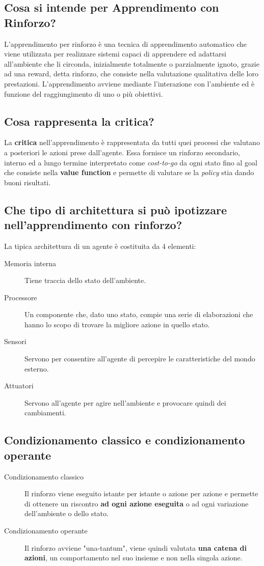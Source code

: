 \documentclass[\main/main.tex]{subfiles}
\begin{document}
\subsection{Cosa si intende per Apprendimento con Rinforzo?}
L'apprendimento per rinforzo è una tecnica di apprendimento automatico che viene utilizzata per realizzare sistemi capaci di apprendere ed adattarsi all'ambiente che li circonda, inizialmente totalmente o parzialmente ignoto, grazie ad una reward, detta rinforzo, che consiste nella valutazione qualitativa delle loro prestazioni. L'apprendimento avviene mediante l'interazione con l'ambiente ed è funzione del raggiungimento di uno o più obiettivi.



\subsection{Cosa rappresenta la critica?}
La \textbf{critica} nell'apprendimento è rappresentata da tutti quei processi che valutano a posteriori le azioni prese dall'agente. Essa fornisce un rinforzo secondario, interno ed a lungo termine interpretato come \textit{cost-to-go} da ogni stato fino al goal che consiste nella \textbf{value function} e permette di valutare se la \textit{policy} stia dando buoni risultati.

\subsection{Che tipo di architettura si può ipotizzare nell'apprendimento con rinforzo?}
La tipica architettura di un agente è costituita da 4 elementi:
\begin{description}
  \item[Memoria interna] Tiene traccia dello stato dell'ambiente.
  \item[Processore] Un componente che, dato uno stato, compie una serie di elaborazioni che hanno lo scopo di trovare la migliore azione in quello stato.
  \item[Sensori] Servono per consentire all'agente di percepire le caratteristiche del mondo esterno.
  \item[Attuatori] Servono all'agente per agire nell'ambiente e provocare quindi dei cambiamenti.
\end{description}

\subsection{Condizionamento classico e condizionamento operante}
\begin{description}
  \item[Condizionamento classico] Il rinforzo viene eseguito istante per istante o azione per azione e permette di ottenere un riscontro \textbf{ad ogni azione eseguita} o ad ogni variazione dell'ambiente o dello stato.
  \item[Condizionamento operante] Il rinforzo avviene "una-tantum", viene quindi valutata \textbf{una catena di azioni}, un comportamento nel suo insieme e non nella singola azione.
\end{description}
\end{document}
